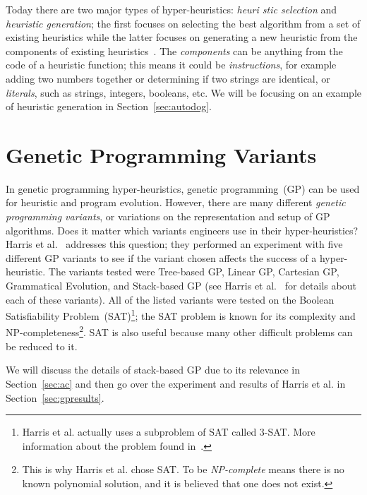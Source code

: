 \documentclass{sig-alternate}
\begin{document}
Today there are two major types of hyper-heuristics: \textit{heuri\- stic selection} and \textit{heuristic generation}; the first focuses on selecting the best algorithm from a set of existing heuristics while the latter focuses on generating a new heuristic from the components of existing heuristics~\cite{pappa:2014}. The \textit{components} can be anything from the code of a heuristic function; this means it could be \textit{instructions}, for example adding two numbers together or determining if two strings are identical, or \textit{literals}, such as strings, integers, booleans, etc. We will be focusing on an example of heuristic generation in Section~\ref{sec:autodog}.

\section{Genetic Programming Variants}
\label{sec:gpvariants}
In genetic programming hyper-heuristics, genetic programming~(GP) can be used for heuristic and program evolution. However, there are many different \textit{genetic programming variants}, or variations on the representation and setup of GP algorithms. Does it matter which variants engineers use in their hyper-heuristics? Harris et al.~\cite{harris:2015} addresses this question; they performed an experiment with five different GP variants to see if the variant chosen affects the success of a hyper-heuristic. The variants tested were Tree-based GP, Linear GP, Cartesian GP, Grammatical Evolution, and Stack-based GP (see Harris et al.~\cite{harris:2015} for details about each of these variants). All of the listed variants were tested on the Boolean Satisfiability Problem~(SAT)\footnote{Harris et al. actually uses a subproblem of SAT called 3-SAT. More information about the problem found in~\cite{harris:2015}.}; the SAT problem is known for its complexity and NP-compl\-eteness\footnote{This is why Harris et al. chose SAT. To be \textit{NP-complete} means there is no known polynomial solution, and it is believed that one does not exist.}. SAT is also useful because many other difficult problems can be reduced to it. 

We will discuss the details of stack-based GP due to its relevance in Section~\ref{sec:ac} and then go over the experiment and results of Harris et al. in Section~\ref{sec:gpresults}.
\end{document}
